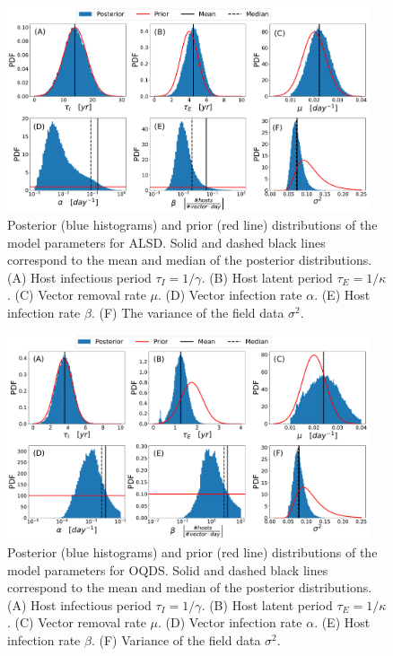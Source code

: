 \begin{figure}[H]
    \centering
    \label{fig:parameter_estimates_ALSD}

    \includegraphics[width=0.95\textwidth]{Figures/Parameter_estimates_ALSD.pdf}
    \caption{Posterior (blue histograms) and prior (red line) distributions
        of the model parameters for ALSD. Solid and dashed black lines
        correspond to
        the mean and median of the posterior distributions. (A) Host infectious
        period
        $\tau_I=1/\gamma$. (B) Host latent period $\tau_E=1/\kappa$.  (C)
        Vector
        removal rate $\mu$. (D) Vector infection rate $\alpha$. (E) Host
        infection rate
        $\beta$. (F) The variance of the field data $\sigma^2$.}
\end{figure}

\begin{figure}[H]
    \centering
    \label{fig:parameter_estimates_OQDS}

    \includegraphics[width=0.95\textwidth]{Figures/Parameter_estimates_OQDS.pdf}
    \caption{Posterior (blue histograms) and prior (red line) distributions
        of the model parameters for OQDS. Solid and dashed black lines
        correspond to
        the mean and median of the posterior distributions. (A) Host infectious
        period
        $\tau_I=1/\gamma$. (B) Host latent period $\tau_E=1/\kappa$. (C) Vector
        removal
        rate $\mu$. (D) Vector infection rate $\alpha$. (E) Host infection rate
        $\beta$. (F) Variance of the field data $\sigma^2$.}
\end{figure}

